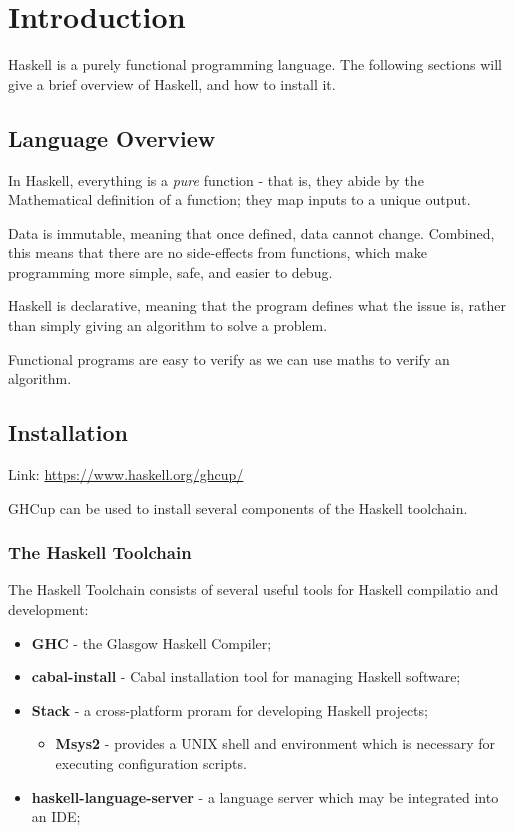 \section{Introduction}
\label{sec:introduction}
Haskell is a purely functional programming language. The following sections will give a brief overview of Haskell, and how to install it.

\subsection{Language Overview}
In Haskell, everything is a \textit{pure} function - that is, they abide by the Mathematical definition of a function; they map inputs to a unique output.

Data is immutable, meaning that once defined, data cannot change. Combined, this means that there are no side-effects from functions, which make programming more simple, safe, and easier to debug.

Haskell is declarative, meaning that the program defines what the issue is, rather than simply giving an algorithm to solve a problem.

Functional programs are easy to verify as we can use maths to verify an algorithm.

\subsection{Installation}
Link: \url{https://www.haskell.org/ghcup/}

GHCup can be used to install several components of the Haskell toolchain.

\subsubsection{The Haskell Toolchain}
The Haskell Toolchain consists of several useful tools for Haskell compilatio and development:

\begin{itemize}
  \item \textbf{GHC} - the Glasgow Haskell Compiler;
  \item \textbf{cabal-install} - Cabal installation tool for managing Haskell software;
  \item \textbf{Stack} - a cross-platform proram for developing Haskell projects;
  \begin{itemize}
    \item \textbf{Msys2} - provides a UNIX shell and environment which is necessary for executing configuration scripts.
  \end{itemize}
  \item \textbf{haskell-language-server} - a language server which may be integrated into an IDE;
\end{itemize}

